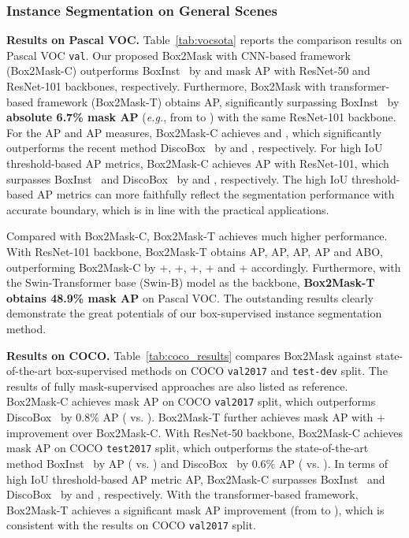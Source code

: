 \documentclass[12pt,onecolumn,letterpaper]{article}
\begin{document}
\subsubsection{Instance Segmentation on General Scenes}

\noindent \textbf{Results on Pascal VOC.}  Table~\ref{tab:vocsota} reports the comparison results on Pascal VOC \texttt{val}. Our proposed Box2Mask with CNN-based framework (Box2Mask-C) outperforms BoxInst~\cite{cvpr2021_boxinst} by   and  mask AP with ResNet-50 and ResNet-101 backbones, respectively. 
Furthermore, Box2Mask with transformer-based framework (Box2Mask-T) obtains  AP, significantly surpassing BoxInst~\cite{cvpr2021_boxinst} by \textbf{absolute 6.7\% mask AP} (\textit{e.g.}, from  to ) with the same ResNet-101 backbone. 
For the AP and AP measures, Box2Mask-C achieves  and , which significantly outperforms the recent method DiscoBox~\cite{iccv2021discobox} by  and , respectively. 
For high IoU threshold-based AP metrics, Box2Mask-C achieves  AP with ResNet-101, which surpasses BoxInst~\cite{cvpr2021_boxinst} and DiscoBox~\cite{iccv2021discobox} by  and , respectively. 
The high IoU threshold-based AP metrics can more faithfully reflect the segmentation
performance with accurate boundary, which is in line with the practical applications.

Compared with Box2Mask-C, Box2Mask-T  achieves much higher performance. With ResNet-101 backbone, Box2Mask-T obtains  AP,  AP,  AP,   AP and  ABO, outperforming Box2Mask-C by +, +,  +, + and + accordingly.
Furthermore, with the Swin-Transformer base (Swin-B) model as the backbone, \textbf{Box2Mask-T obtains 48.9\% mask AP} on Pascal VOC. 
The outstanding results clearly demonstrate the great potentials of our box-supervised instance segmentation method. 

\textbf{Results on COCO.} 
Table~\ref{tab:coco_results} compares Box2Mask against state-of-the-art box-supervised methods on COCO \texttt{val2017} and \texttt{test-dev} split. The results of fully mask-supervised approaches are also listed as reference. Box2Mask-C achieves  mask AP on COCO \texttt{val2017} split, which outperforms DiscoBox~\cite{iccv2021discobox} by 0.8\% AP ( vs. ). Box2Mask-T further achieves  mask AP with + improvement over Box2Mask-C. 
With ResNet-50 backbone, Box2Mask-C achieves  mask AP on COCO \texttt{test2017} split, which outperforms the state-of-the-art method BoxInst~\cite{cvpr2021_boxinst} by  AP ( vs. ) and DiscoBox~\cite{iccv2021discobox} by 0.6\% AP ( vs. ). In terms of high IoU threshold-based AP metric AP, Box2Mask-C surpasses BoxInst~\cite{cvpr2021_boxinst} and DiscoBox~\cite{iccv2021discobox} by  and , respectively. With the transformer-based framework, Box2Mask-T achieves a significant mask AP improvement (from  to ), which is consistent with the results on COCO \texttt{val2017} split. 
\end{document}
